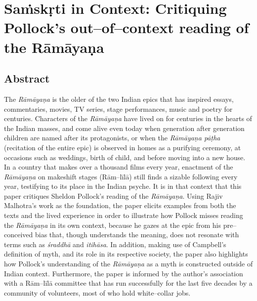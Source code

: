 
\chapter{Saṁskṛti in Context: Critiquing Pollock’s out–of–context reading of the Rāmāyaṇa}\label{chapter7}



\section*{Abstract}

The \textit{Rāmāyaṇa} is the older of the two Indian epics that has inspired essays, commentaries, movies, TV series, stage performances, music and poetry for centuries. Characters of the \textit{Rāmāyaṇa} have lived on for centuries in the hearts of the Indian masses, and come alive even today when generation after generation children are named after its protagonists, or when the \textit{Rāmāyaṇa pāṭha} (recitation of the entire epic) is observed in homes as a purifying ceremony, at occasions such as weddings, birth of child, and before moving into a new house. In a country that makes over a thousand films every year, enactment of the \textit{Rāmāyaṇa} on makeshift stages (Rām–līlā) still finds a sizable following every year, testifying to its place in the Indian psyche. It is in that context that this paper critiques Sheldon Pollock’s reading of the \textit{Rāmāyaṇa}. Using Rajiv Malhotra’s work as the foundation, the paper elicits examples from both the texts and the lived experience in order to illustrate how Pollock misses reading the \textit{Rāmāyaṇa} in its own context, because he gazes at the epic from his pre–conceived bias that, though understands the meaning, does not resonate with terms such as \textit{śraddhā} and \textit{itihāsa}. In addition, making use of Campbell’s definition of myth, and its role in its respective society, the paper also highlights how Pollock’s understanding of the \textit{Rāmāyaṇa} as a myth is constructed outside of Indian context. Furthermore, the paper is informed by the author’s association with a Rām–līlā committee that has run successfully for the last five decades by a community of volunteers, most of who hold white–collar jobs.

